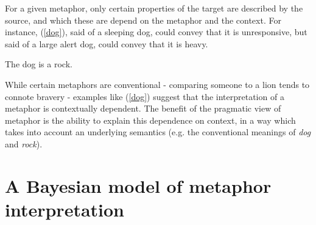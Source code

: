 \documentclass[9pt,twocolumn,twoside,lineno]{pnas-new}
\begin{document}

	For a given metaphor, only certain properties of the target are described by the source, and which these are depend on the metaphor and the context. For instance, (\ref{dog}), said of a sleeping dog, could convey that it is unresponsive, but said of a large alert dog, could convey that it is heavy.


	\begin{examples}
	\item The dog is a rock. \label{dog}
	\end{examples}

	While certain metaphors are conventional - comparing someone to a lion tends to connote bravery - examples like (\ref{dog}) suggest that the interpretation of a metaphor is contextually dependent. The benefit of the pragmatic view of metaphor is the ability to explain this dependence on context, in a way which takes into account an underlying semantics (e.g. the conventional meanings of \emph{dog} and \emph{rock}).
	
\section{A Bayesian model of metaphor interpretation} \label{rsa}
	
\end{document}
